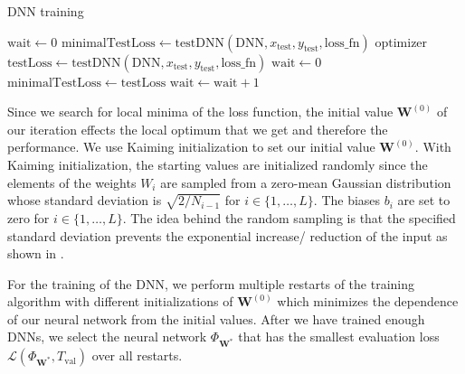 \begin{algorithm}[H]%
\caption{\label{trainDNN}DNN training}
\begin{algorithmic}[1]
\State $\mathrm{wait} \gets 0$
\State $\mathrm{minimalTestLoss} \gets \mathrm{testDNN}(\mathrm{DNN}, x_\mathrm{test}, y_\mathrm{test}, \mathrm{loss\_fn})$
\State {}%
\State {}$\mathrm{optimizer}$
\State $\mathrm{testLoss} \gets \mathrm{testDNN}(\mathrm{DNN}, x_\mathrm{test}, y_\mathrm{test}, \mathrm{loss\_fn})$
\State $\mathrm{wait} \gets 0$
\State $\mathrm{minimalTestLoss} \gets \mathrm{testLoss}$
\State {}%
\Else
\State $\mathrm{wait} \gets \mathrm{wait}+1$
\EndIf
{}
\State {}%
\State \Return
\EndIf
\EndFor
\EndProcedure
\end{algorithmic}
\end{algorithm}

Since we search for local minima of the loss function, the initial value $\mathbf{W}^{(0)}$ of our iteration effects the local optimum that we get and therefore the performance. We use Kaiming initialization \cite{7410480} to set our initial value $\mathbf{W}^{(0)}$. With Kaiming initialization, the starting values are initialized randomly since the elements of the weights $W_i$ are sampled from a zero-mean Gaussian distribution whose standard deviation is $\sqrt{2/N_{i-1}}$ for $i\in\{1,\dotsc,L\}$. The biases $b_i$ are set to zero for $i\in\{1,\dotsc,L\}$. The idea behind the random sampling is that the specified standard deviation prevents the exponential increase/ reduction of the input as shown in \cite{7410480}.

For the training of the DNN, we perform multiple restarts of the training algorithm with different initializations of $\mathbf{W}^{(0)}$ which minimizes the dependence of our neural network from the initial values. After we have trained enough DNNs, we select the neural network $\Phi_{\mathbf{W}^*}$ that has the smallest evaluation loss $\mathscr{L}(\Phi_{\mathbf{W}^*},T_\mathrm{val})$ over all restarts.

